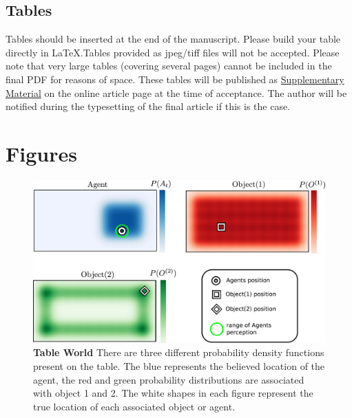 \documentclass{frontiersSCNS} %
\begin{document}
\subsection{Tables}
Tables should be inserted at the end of the manuscript. Please build your table directly in LaTeX.Tables provided as jpeg/tiff files will not be accepted. Please note that very large tables (covering several pages) cannot be included in the final PDF for reasons of space. These tables will be published as \href{http://home.frontiersin.org/about/author-guidelines#SupplementaryMaterial}{Supplementary Material} on the online article page at the time of acceptance. The author will be notified during the typesetting of the final article if this is the case. 

 



\section*{Figures}



\begin{figure}
  \centering
  \includegraphics[width=0.95\linewidth]{Figure1}
  \caption{\textbf{Table World} There are three different probability density functions present on the table. 
  The blue represents the believed location of the agent, the red and green probability distributions are associated with object 1 and 2.
  The white shapes in each figure represent the true location of each associated object or agent.}
  \label{fig:Figure1}
\end{figure}
\end{document}
